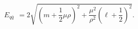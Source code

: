 \begin{equation}                                
E_{q \bar{q}}~~= 2\sqrt{(m+\frac{1}{2} \mu \rho)^{2}+                              
\frac{\mu^{2}}{\rho^{2}} (\ell+\frac{1}{2})^{2}} .                                
\end{equation} 
